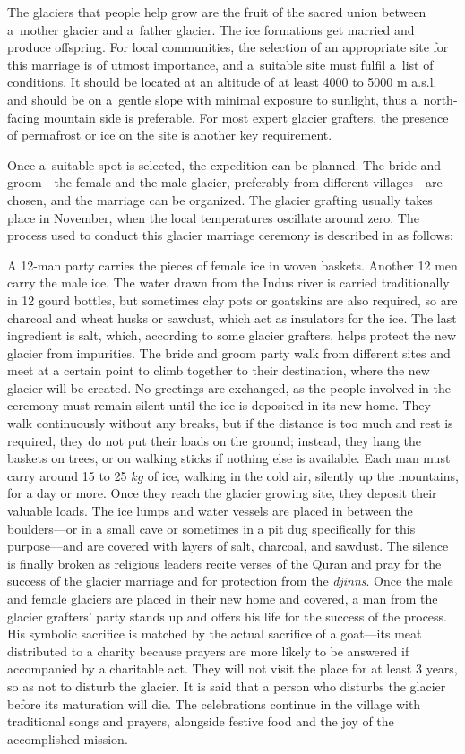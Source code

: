 The glaciers that people help grow are the fruit of the sacred union between a mother glacier and a father
glacier. The ice formations get married and produce offspring. For local communities, the selection of an
appropriate site for this marriage is of utmost importance, and a suitable site must fulfil a list of
conditions. It should be located at an altitude of at least 4000 to 5000 m \ac{a.s.l.} and should be on a gentle
slope with minimal exposure to sunlight, thus a north-facing mountain side is preferable. For most expert
glacier grafters, the presence of permafrost or ice on the site is another key requirement. 

Once a suitable spot is selected, the expedition can be planned. The bride and groom---the female and the male
glacier, preferably from different villages---are chosen, and the marriage can be organized. The glacier
grafting usually takes place in November, when the local temperatures oscillate around zero. The process used to
conduct this glacier marriage ceremony is described in \citet{khanMarriageGlaciersPrzekroj2020} as follows:

A 12-man party carries the pieces of female ice in woven baskets. Another 12 men carry the male ice. The water
drawn from the Indus river is carried traditionally in 12 gourd bottles, but sometimes clay pots or goatskins
are also required, so are charcoal and wheat husks or sawdust, which act as insulators for the ice. The last
ingredient is salt, which, according to some glacier grafters, helps protect the new glacier from impurities.
The bride and groom party walk from different sites and meet at a certain point to climb together to their
destination, where the new glacier will be created. No greetings are exchanged, as the people involved in the
ceremony must remain silent until the ice is deposited in its new home. They walk continuously without
any breaks, but if the distance is too much and rest is required, they do not put their loads on the ground;
instead, they hang the baskets on trees, or on walking sticks if nothing else is available. Each man must
carry around 15 to 25 $kg$ of ice, walking in the cold air, silently up the mountains, for a day or more. Once
they reach the glacier growing site, they deposit their valuable loads. The ice lumps and water vessels are
placed in between the boulders---or in a small cave or sometimes in a pit dug specifically for this purpose---and
are covered with layers of salt, charcoal, and sawdust. The silence is finally broken as religious leaders recite
verses of the Quran and pray for the success of the glacier marriage and for protection from the \textit{djinns}. Once
the male and female glaciers are placed in their new home and covered, a man from the glacier grafters' party
stands up and offers his life for the success of the process. His symbolic sacrifice is matched by the actual
sacrifice of a goat---its meat distributed to a charity because prayers are more likely to be answered if
accompanied by a charitable act. They will not visit the place for at least 3 years, so as not to disturb
the glacier. It is said that a person who disturbs the glacier before its maturation will die. The celebrations
continue in the village with traditional songs and prayers, alongside festive food and the joy of the
accomplished mission.

